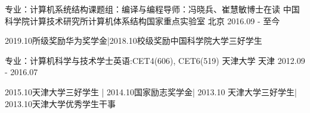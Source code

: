 

\begin{cventries}

\cventry
{专业：计算机系统结构{\enskip}课题组：编译与编程{\enskip}导师：冯晓兵、崔慧敏{\enskip}博士在读} %
{中国科学院{\enskip}计算技术研究所{\enskip}计算机体系结构国家重点实验室} %
{北京} %
{2016.09 - 至今} %
{
  \begin{cvitems} %
    \item {2019.10{\enskip}所级奖励{\enskip}华为奖学金{\enskip}|{\enskip}2018.10{\enskip}校级奖励{\enskip}中国科学院大学三好学生}
  \end{cvitems}
}


  \cventry
    {专业：计算机科学与技术{\enskip}学士{\enskip\cdotp\enskip}{英语:CET4(606), CET6(519)}} %
    {天津大学} %
    {天津} %
    {2012.09 - 2016.07} %
    {
      \begin{cvitems} %
        \item {2015.10{\enskip}天津大学三好学生 {\enskip}|
        {\enskip} 2014.10{\enskip}国家励志奖学金{\enskip}|
        {\enskip}2013.10 {\enskip}天津大学三好学生{\enskip}|
        {\enskip}2013.10{\enskip}天津大学优秀学生干事}
      \end{cvitems}
    }



\end{cventries}
